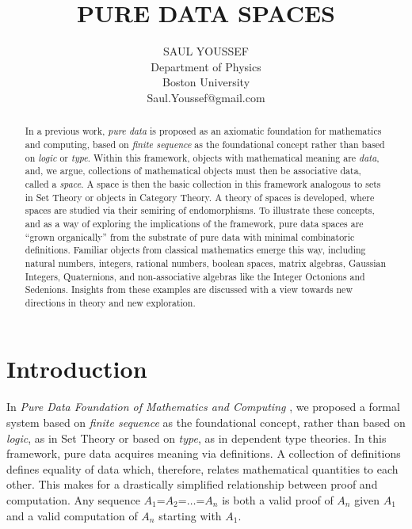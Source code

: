 \documentclass[11pt]{article}
\begin{document}
\title{\bf {PURE DATA SPACES}}
\author{%
  SAUL YOUSSEF%
  \hfil \\
  Department of Physics \\
  Boston University \\
  Saul.Youssef@gmail.com
}
\maketitle
\begin{abstract}
In a previous work, {\it pure data} is proposed as an axiomatic foundation for mathematics and computing, based on {\it finite sequence} as 
the foundational concept rather than based on {\it logic} or {\it type}.   Within this framework, objects with mathematical meaning are 
{\it data}, and, we argue, collections of mathematical objects must then be associative data, called a {\it space}.  A space is then the basic collection in this 
framework analogous to sets in Set Theory or objects in Category Theory.  A theory of spaces is developed, where 
spaces are studied via their semiring of endomorphisms.  To illustrate these concepts, and as a way of 
exploring the implications of the framework, pure data spaces are ``grown organically'' from the substrate of 
pure data with minimal combinatoric definitions.  Familiar objects from classical mathematics emerge this way,   
including natural numbers, integers, rational numbers, boolean spaces, matrix algebras, Gaussian Integers, Quaternions, 
and non-associative algebras like the Integer Octonions and Sedenions. 
Insights from these examples are discussed with a view towards new directions in theory and new exploration.
\end{abstract}

\theoremstyle{definition}
\newtheorem{axiom}{Axiom}
\newtheorem*{axiom*}{Axiom}
\newtheorem*{fact}{Fact}
\newtheorem{theorem}{Theorem}[section]
\newtheorem{lemma}{Lemma}
\newtheorem{corollary}[theorem]{Corollary}

\newtheorem{definition}{Definition}

\newtheorem*{remark}{}

\section{Introduction}

    In {\it Pure Data Foundation of Mathematics and Computing} \cite{PDF}, we proposed a formal system based on {\it finite sequence} as the foundational concept, rather than based on {\it logic}, as in Set Theory or 
based on {\it type}, as in dependent type theories.  In this framework, pure data acquires meaning via definitions.  
A collection of definitions defines equality of data which, therefore, relates mathematical quantities to 
each other.  This makes for a drastically simplified relationship between proof and computation.   
Any sequence $A_1$=$A_2$=$\dots$=$A_n$ is both a valid proof of $A_n$ given $A_1$ and a valid computation 
of $A_n$ starting with $A_1$.  
\end{document}
